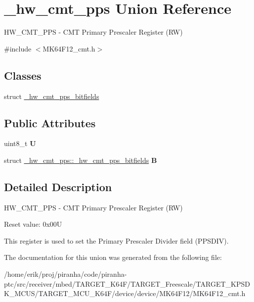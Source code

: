 \hypertarget{union__hw__cmt__pps}{}\section{\+\_\+hw\+\_\+cmt\+\_\+pps Union Reference}
\label{union__hw__cmt__pps}


H\+W\+\_\+\+C\+M\+T\+\_\+\+P\+PS -\/ C\+MT Primary Prescaler Register (RW)  




{\ttfamily \#include $<$M\+K64\+F12\+\_\+cmt.\+h$>$}

\subsection*{Classes}
\begin{DoxyCompactItemize}
\item 
struct \hyperlink{struct__hw__cmt__pps_1_1__hw__cmt__pps__bitfields}{\+\_\+hw\+\_\+cmt\+\_\+pps\+\_\+bitfields}
\end{DoxyCompactItemize}
\subsection*{Public Attributes}
\begin{DoxyCompactItemize}
\item 
uint8\+\_\+t {\bfseries U}\hypertarget{union__hw__cmt__pps_a0d8906a83c6d1bd5c4d98f2798f66e4c}{}\label{union__hw__cmt__pps_a0d8906a83c6d1bd5c4d98f2798f66e4c}

\item 
struct \hyperlink{struct__hw__cmt__pps_1_1__hw__cmt__pps__bitfields}{\+\_\+hw\+\_\+cmt\+\_\+pps\+::\+\_\+hw\+\_\+cmt\+\_\+pps\+\_\+bitfields} {\bfseries B}\hypertarget{union__hw__cmt__pps_abb76b9f928e014f2dea95323b838277d}{}\label{union__hw__cmt__pps_abb76b9f928e014f2dea95323b838277d}

\end{DoxyCompactItemize}


\subsection{Detailed Description}
H\+W\+\_\+\+C\+M\+T\+\_\+\+P\+PS -\/ C\+MT Primary Prescaler Register (RW) 

Reset value\+: 0x00U

This register is used to set the Primary Prescaler Divider field (P\+P\+S\+D\+IV). 

The documentation for this union was generated from the following file\+:\begin{DoxyCompactItemize}
\item 
/home/erik/proj/piranha/code/piranha-\/ptc/src/receiver/mbed/\+T\+A\+R\+G\+E\+T\+\_\+\+K64\+F/\+T\+A\+R\+G\+E\+T\+\_\+\+Freescale/\+T\+A\+R\+G\+E\+T\+\_\+\+K\+P\+S\+D\+K\+\_\+\+M\+C\+U\+S/\+T\+A\+R\+G\+E\+T\+\_\+\+M\+C\+U\+\_\+\+K64\+F/device/device/\+M\+K64\+F12/M\+K64\+F12\+\_\+cmt.\+h\end{DoxyCompactItemize}
